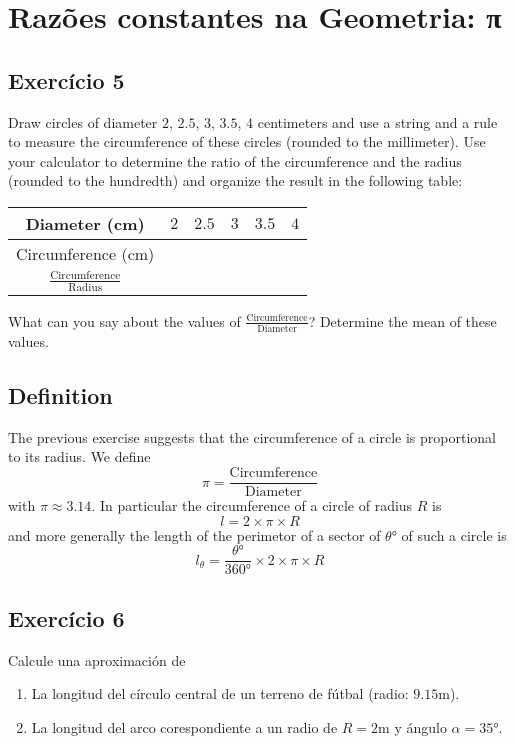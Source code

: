 \section{Razões constantes na Geometria: π}

\subsection*{Exercício 5}

Draw circles of diameter $2$, $2.5$, $3$, $3.5$, $4$ centimeters and use a
string and a rule to measure the circumference of these circles (rounded to the
millimeter). Use your calculator to determine the ratio of the circumference
and the radius (rounded to the hundredth)
and organize the result in the following table:

\begin{center}
\begin{tabular}{| c | c  | c | c | c | c |}
\hline
Diameter (cm) & $2$ & $2.5$ & $3$ & $3.5$ & $4$ \\
\hline
Circumference (cm) &  &  &  &  & \\
\hline
$\frac{\text{Circumference}}{\text{Radius}}$ &  &  &  &  &  \\
\hline
\end{tabular}
\end{center}

What can you say about the values of
$\frac{\text{Circumference}}{\text{Diameter}}$? Determine the mean of these
values.

\subsection*{Definition}

The previous exercise suggests that the circumference of a circle is
proportional to its radius. We define
$$
\pi = \frac{\text{Circumference}}{\text{Diameter}}
$$
with $\pi \approx 3.14$. In particular the circumference of a circle of
radius $R$ is
$$l = 2 \times \pi \times R$$
and more generally the length of the perimetor of a sector of $\theta$° of
such a circle is
$$l_\theta = \frac{\theta°}{360°} \times 2 \times \pi \times R$$

\subsection*{Exercício 6}

Calcule una aproximación de

\begin{enumerate}
\item La longitud del círculo central de un terreno de fútbal (radio: $9.15$m).
\item La longitud del arco corespondiente a un radio de $R=2$m y ángulo
$\alpha=35$°.
\end{enumerate}

